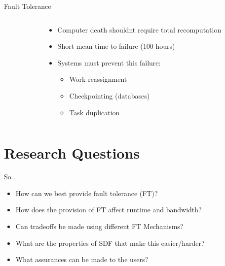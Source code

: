 \documentclass{beamer}
\begin{document}
\begin{frame}{Fault Tolerance}
\begin{columns}
\begin{column}{4cm}
\end{column}
\begin{column}{6cm}
\begin{itemize}
	\item Computer death shouldnt require total recomputation
	\item Short mean time to failure (100 hours) \cite{ree06}
	\item Systems must prevent this failure:
	\begin{itemize}
		\item Work reassignment \cite{dea08}
		\item Checkpointing (databases)
		\item Task duplication
	\end{itemize}
\end{itemize}
\end{column}
\end{columns}
\end{frame}

\section{Research Questions}

\begin{frame}{So...}
\begin{itemize}
	\item How can we best provide fault tolerance (FT)?
	\item How does the provision of FT affect runtime and bandwidth?
	\item Can tradeoffs be made using different FT Mechanisms?
	\item What are the properties of SDF that make this easier/harder?
	\item What assurances can be made to the users?
\end{itemize}
\end{frame}
\end{document}
